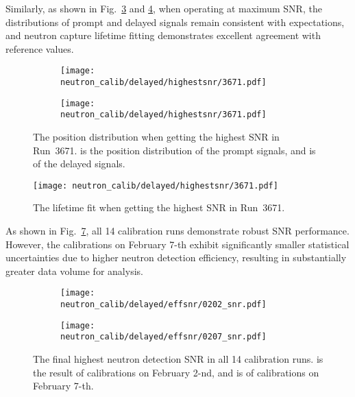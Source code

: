 Similarly, as shown in Fig.~\ref{fig:highestSNRPos} and \ref{fig:3671_HighestSNRDtFit}, when operating at maximum SNR, the distributions of prompt and delayed signals remain consistent with expectations, and neutron capture lifetime fitting demonstrates excellent agreement with reference values.
\begin{figure}[htbp]
	\begin{subfigure}{0.5\textwidth}
		\centering
		\texttt{[image: neutron\_calib/delayed/highestsnr/3671.pdf]}
		\caption{}
		\label{fig:3671HighestSNRProPos}
	\end{subfigure}%
	\begin{subfigure}{0.5\textwidth}
		\centering
		\texttt{[image: neutron\_calib/delayed/highestsnr/3671.pdf]}
		\caption{}
		\label{fig:3671HighestSNRDelPos}
	\end{subfigure}
	\caption{The position distribution when getting the highest SNR in Run~3671.  is the position distribution of the prompt signals, and  is of the delayed signals.}
	\label{fig:highestSNRPos}
\end{figure}
\begin{figure}[htbp]
	\centering
	\texttt{[image: neutron\_calib/delayed/highestsnr/3671.pdf]}
	\caption{The lifetime fit when getting the highest SNR in Run~3671.}
	\label{fig:3671_HighestSNRDtFit}
\end{figure}

As shown in Fig.~\ref{fig:SummarySNR}, all 14 calibration runs demonstrate robust SNR performance. However, the calibrations on February 7-th exhibit significantly smaller statistical uncertainties due to higher neutron detection efficiency, resulting in substantially greater data volume for analysis.
\begin{figure}[htbp]
	\begin{subfigure}{0.5\textwidth}
		\centering
		\texttt{[image: neutron\_calib/delayed/effsnr/0202\_snr.pdf]}
		\caption{}
		\label{fig:SummarySNR0202}
	\end{subfigure}%
	\begin{subfigure}{0.5\textwidth}
		\centering
		\texttt{[image: neutron\_calib/delayed/effsnr/0207\_snr.pdf]}
		\caption{}
		\label{fig:SummarySNR0207}
	\end{subfigure}
	\caption{The final highest neutron detection SNR in all 14 calibration runs.  is the result of calibrations on February 2-nd, and  is of calibrations on February 7-th. }
	\label{fig:SummarySNR}
\end{figure}


